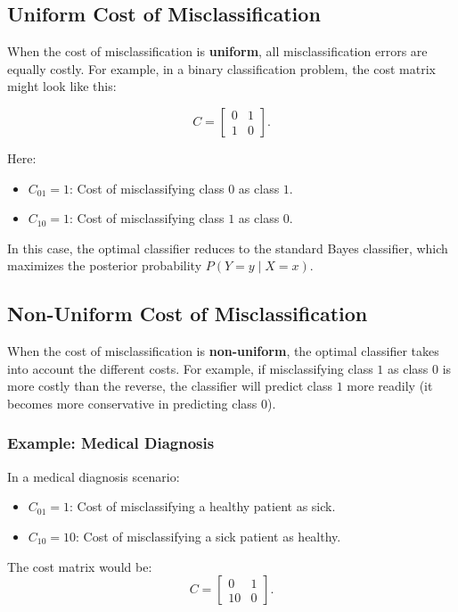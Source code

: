 \begin{notechapter}
\subsection{Uniform Cost of Misclassification}
When the cost of misclassification is \textbf{uniform}, all misclassification errors are equally costly. For example, in a binary classification problem, the cost matrix might look like this:

\[
C = \begin{bmatrix}
0 & 1 \\
1 & 0
\end{bmatrix}.
\]

Here:
\begin{itemize}
    \item \( C_{01} = 1 \): Cost of misclassifying class \( 0 \) as class \( 1 \).
    \item \( C_{10} = 1 \): Cost of misclassifying class \( 1 \) as class \( 0 \).
\end{itemize}

In this case, the optimal classifier reduces to the standard Bayes classifier, which maximizes the posterior probability \( P(Y = y \mid X = x) \).

\subsection{Non-Uniform Cost of Misclassification}
When the cost of misclassification is \textbf{non-uniform}, the optimal classifier takes into account the different costs. For example, if misclassifying class \( 1 \) as class \( 0 \) is more costly than the reverse, the classifier will predict class \( 1 \) more readily (it becomes more conservative in predicting class \( 0 \)).

\subsubsection{Example: Medical Diagnosis}
In a medical diagnosis scenario:
\begin{itemize}
    \item \( C_{01} = 1 \): Cost of misclassifying a healthy patient as sick.
    \item \( C_{10} = 10 \): Cost of misclassifying a sick patient as healthy.
\end{itemize}

The cost matrix would be:
\[
C = \begin{bmatrix}
0 & 1 \\
10 & 0
\end{bmatrix}.
\]


\end{notechapter}
